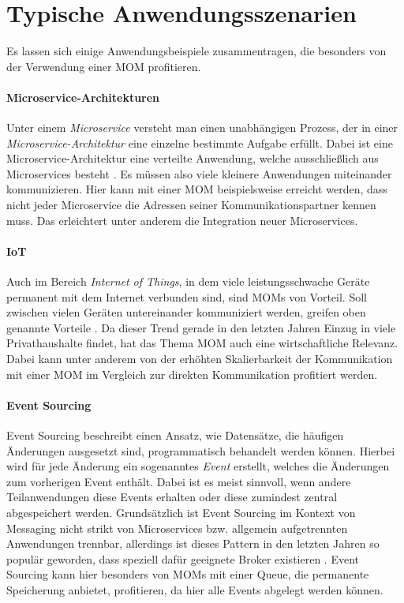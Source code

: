 \label{Message Broker:scenarios}
\section{Typische Anwendungsszenarien}
Es lassen sich einige Anwendungsbeispiele zusammentragen, die besonders von der
Verwendung einer MOM profitieren.

\paragraph{Microservice-Architekturen}
Unter einem \textit{Microservice} versteht man einen unabhängigen Prozess, der
in einer \textit{Microservice-Architektur} eine einzelne bestimmte Aufgabe erfüllt.
Dabei ist eine Microservice-Architektur eine verteilte Anwendung, welche
ausschließlich aus Microservices besteht \cite{fowler2005micro}.
Es müssen also viele kleinere Anwendungen miteinander kommunizieren.
Hier kann mit einer MOM beispielsweise erreicht werden, dass nicht jeder
Microservice die Adressen seiner Kommunikationspartner kennen muss. Das
erleichtert unter anderem die Integration neuer Microservices.

\paragraph{IoT}
Auch im Bereich \textit{Internet of Things}, in dem viele leistungsschwache Geräte
permanent mit dem Internet verbunden sind, sind MOMs von Vorteil. Soll zwischen
vielen Geräten untereinander kommuniziert werden, greifen oben genannte Vorteile \cite{razzaque2016middleware}.
Da dieser Trend gerade in den letzten Jahren Einzug in viele Privathaushalte findet,
hat das Thema MOM auch eine wirtschaftliche Relevanz.
Dabei kann unter anderem von der erhöhten Skalierbarkeit der Kommunikation mit
einer MOM im Vergleich zur direkten Kommunikation profitiert werden.

\paragraph{Event Sourcing}
Event Sourcing beschreibt einen Ansatz, wie Datensätze, die häufigen Änderungen
ausgesetzt sind, programmatisch behandelt werden können. Hierbei wird für jede
Änderung ein sogenanntes \textit{Event} erstellt, welches die Änderungen zum vorherigen
Event enthält. Dabei ist es meist sinnvoll, wenn andere Teilanwendungen diese Events
erhalten oder diese zumindest zentral abgespeichert werden.
Grundsätzlich ist Event Sourcing im Kontext von Messaging nicht strikt
von Microservices bzw. allgemein aufgetrennten Anwendungen trennbar, allerdings
ist dieses Pattern in den letzten Jahren so populär geworden, dass speziell dafür
geeignete Broker existieren \cite{fowler2005event,ApacheKa84:online}.
Event Sourcing kann hier besonders von MOMs mit einer Queue, die permanente
Speicherung anbietet, profitieren, da hier alle Events abgelegt werden können.
